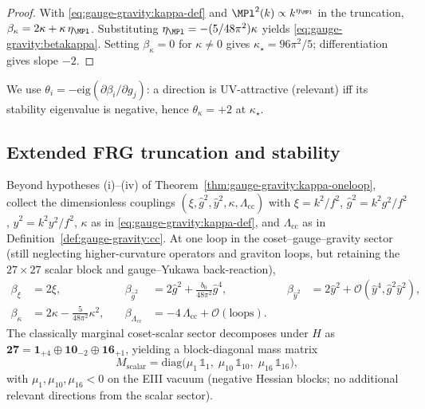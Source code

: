 \begin{proof}
With \eqref{eq:gauge-gravity:kappa-def} and
$\MPl^2(k)\propto k^{\eta_{\MPl}}$ in the truncation,
$\beta_\kappa=2\kappa+\kappa\,\eta_{\MPl}$. Substituting
$\eta_{\MPl}=-(5/48\pi^2)\kappa$ yields
\eqref{eq:gauge-gravity:betakappa}. Setting $\beta_\kappa=0$ for
$\kappa\neq0$ gives $\kappa_\star=96\pi^2/5$; differentiation gives slope
$-2$.
\end{proof}

\begin{remark}[Convention]
\label{rmk:gauge-gravity:kappa-convention}
We use $\theta_i=-\mathrm{eig}(\partial\beta_i/\partial g_j)$: a direction
is UV-attractive (relevant) iff its stability eigenvalue is negative, hence
$\theta_\kappa=+2$ at $\kappa_\star$.
\end{remark}

\subsection{Extended FRG truncation and stability}
\label{sec:gauge-gravity:frg-extended}

Beyond hypotheses (i)--(iv) of Theorem~\ref{thm:gauge-gravity:kappa-oneloop},
collect the dimensionless couplings
$(\xi,\hat g^2,\hat y^2,\kappa,\Lambda_{\mathrm{cc}})$ with
$\xi=k^2/f^2$, $\hat g^2=k^2 g^2/f^2$, $\hat y^2=k^2 y^2/f^2$,
$\kappa$ as in \eqref{eq:gauge-gravity:kappa-def}, and
$\Lambda_{\mathrm{cc}}$ as in Definition~\ref{def:gauge-gravity:cc}.
At one loop in the coset--gauge--gravity sector (still neglecting
higher-curvature operators and graviton loops, but retaining the
$27\times27$ scalar block and gauge--Yukawa back-reaction),
\begin{equation}\label{eq:gauge-gravity:frg-system}
\begin{aligned}
  \beta_{\xi}&=2\xi,
  &\quad
  \beta_{\hat g^2}&=2\hat g^2+\frac{b_0}{48\pi^2}\hat g^4,
  &\quad
  \beta_{\hat y^2}&=2\hat y^2+\mathcal{O}(\hat y^4,\hat g^2\hat y^2),
  \\[4pt]
  \beta_{\kappa}&=2\kappa-\frac{5}{48\pi^2}\kappa^2,
  &\quad
  \beta_{\Lambda_{\mathrm{cc}}}&=-4\,\Lambda_{\mathrm{cc}}+\mathcal{O}(\text{loops}).
\end{aligned}
\end{equation}
The classically marginal coset-scalar sector decomposes under $H$ as
$\mathbf{27}=\mathbf{1}_{+4}\oplus\mathbf{10}_{-2}\oplus\mathbf{16}_{+1}$,
yielding a block-diagonal mass matrix
\begin{equation}\label{eq:gauge-gravity:27block}
  M_{\mathrm{scalar}}
  =\mathrm{diag}\bigl(\mu_{1}\,\mathbb{1}_{1},\;
                       \mu_{10}\,\mathbb{1}_{10},\;
                       \mu_{16}\,\mathbb{1}_{16}\bigr),
\end{equation}
with $\mu_{1},\mu_{10},\mu_{16}<0$ on the EIII vacuum (negative Hessian
blocks; no additional relevant directions from the scalar sector).


